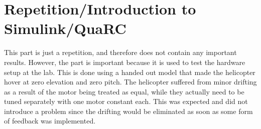 \section{Repetition/Introduction to Simulink/QuaRC}\label{sec:prob1}

This part is just a repetition, and therefore does not contain any important results. However, the part is important because it is used to test the hardware setup at the lab. This is done using a handed out model that made the helicopter hover at zero elevation and zero pitch. The helicopter suffered from minor drifting as a result of the motor being treated as equal, while they actually need to be tuned separately with one motor constant each. This was expected and did not introduce a problem since the drifting would be eliminated as soon as some form of feedback was implemented.